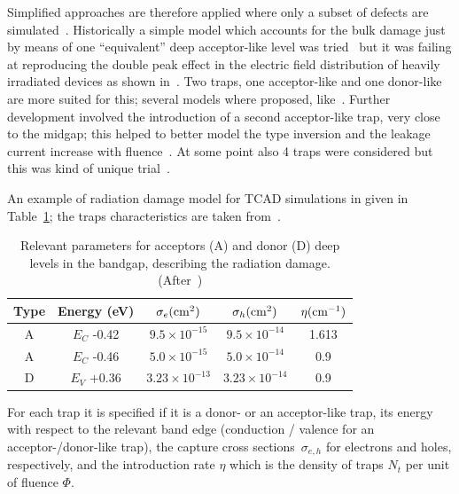 Simplified approaches are therefore applied where only a subset of defects are simulated~\cite{Passeri1998,Passeri2001,Moscatelli-2002,bib:DP,Moscatelli-2004,Chiochia2005,CHIOCHIA2006,Moscatelli-2006,Pennicard:2008zz,dalal2014simulation,Passeri2015}. 
Historically a simple model which accounts for the bulk damage just by means of one ``equivalent'' 
deep acceptor-like level was tried~\cite{Passeri1998,Passeri2001} but it was failing at reproducing the 
double peak effect in the electric field distribution of heavily irradiated devices as shown in~\cite{Li1992}.
Two traps, one acceptor-like and one donor-like are more suited for this; several models where 
proposed, like~\cite{bib:DP,Chiochia2005,CHIOCHIA2006,dalal2014simulation}. 
Further development involved the introduction of a second acceptor-like trap, very close to the midgap; 
this helped to better model the type inversion and the leakage current increase with 
fluence~\cite{Moscatelli-2004,Moscatelli-2006,Pennicard:2008zz,Passeri2015}. At some point also 
4 traps were considered but this was kind of unique trial~\cite{Moscatelli-2002}.

An example of radiation damage model for TCAD simulations in given in Table~\ref{tab:raddammodelpars}; the traps characteristics are taken from~\cite{Pennicard:2008zz}.

\begin{table}[!htbp]
\centering
\caption{\label{tab:raddammodelpars}Relevant parameters for  acceptors (A) and donor (D) deep levels in the bandgap, describing the radiation damage. (After~\cite{Pennicard:2008zz})}
\begin{tabular}{ccccc}
  Type & Energy (eV) & $\sigma_e (\rm{cm}^2)$ & $\sigma_h (\rm{cm}^2)$ & $\eta  (\rm{cm}^{-1})$ \\ 
  \hline
  A &   $E_C $ -0.42 &  $9.5 \times10^{-15} $ &  $9.5 \times 10^{-14} $ & 1.613 \\
  A &   $E_C $ -0.46  &  $5.0 \times10^{-15} $ &  $5.0 \times 10^{-14} $ & 0.9 \\
  D &   $E_V $ +0.36  &  $3.23 \times10^{-13} $ &  $3.23 \times 10^{-14} $ & 0.9 
\end{tabular}
\end{table}
For each trap it is specified if it is a donor- or an acceptor-like trap, its energy with respect to 
the relevant band edge (conduction / valence for an acceptor-/donor-like trap), the capture 
cross sections~$\sigma_{e,h}$ for electrons and holes, respectively, and the introduction rate $\eta$ 
which is the density of traps $N_t$ per unit of fluence $\Phi$.

